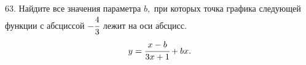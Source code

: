 63. Найдите все значения параметра $b,$ при которых точка графика следующей функции с абсциссой $-\cfrac{4}{3}$ лежит на оси абсцисс.
$$y=\cfrac{x-b}{3x+1}+bx.$$
